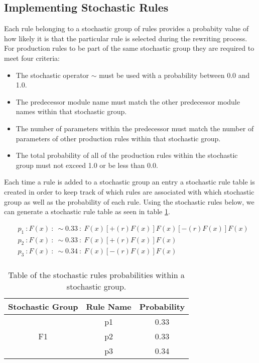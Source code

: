 \subsection{Implementing Stochastic Rules} \label{stochastic rules}

Each rule belonging to a stochastic group of rules provides a probabity value of how likely it is that the particular rule is selected during the rewriting process. For production rules to be part of the same stochastic group they are required to meet four criteria: 

\begin{itemize}
\item The stochastic operator $\sim$ must be used with a probability between 0.0 and 1.0.
\item The predecessor module name must match the other predecessor module names within that stochastic group.
\item The number of parameters within the predecessor must match the number of parameters of other production rules within that stochastic group.
\item The total probability of all of the production rules within the stochastic group must not exceed 1.0 or be less than 0.0.
\end{itemize}

Each time a rule is added to a stochastic group an entry a stochastic rule table is created in order to keep track of which rules are associated with which stochastic group as well as the probability of each rule. Using the stochastic rules below, we can generate a stochastic rule table as seen in table \ref{stochastic table}. 

\begin{equation} \label{stochastic implementation example}
\begin{aligned}
	&p_1~ :  F(x)~ :~ \sim 0.33 ~ :~ F(x)[+(r)F(x)]F(x)[-(r)F(x)]F(x)\\
	&p_2~ :  F(x)~ :~ \sim 0.33 ~ :~ F(x)[+(r)F(x)]F(x)\\
	&p_3~ :  F(x)~ :~ \sim 0.34 ~ :~ F(x)[-(r)F(x)]F(x)\\
\end{aligned}
\end{equation}

\begin{table}[h!] \center
\begin{tabular}{ | c | c | c | }
\hline
	Stochastic Group & Rule Name & Probability\\  
\hline
\hline
\multirow{3}{*}{F1} & p1 & 0.33 \\
& p2 & 0.33 \\
& p3 & 0.34 \\
\hline
\end{tabular}
\caption{Table of the stochastic rules probabilities within a stochastic group.}
\label{stochastic table}
\end{table}
\FloatBarrier

